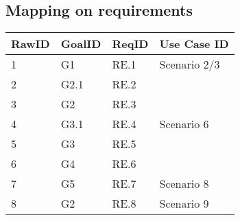 \subsection{Mapping on requirements}
\begin{center}
	\begin{tabular}{ | l | p{2cm} | p{2cm}| p{2cm}|} 
		\hline
		 RawID & GoalID & ReqID & Use Case ID \\
		\hline
		1&G1&RE.1&Scenario 2/3\\
		\hline
		2&G2.1&RE.2&\\
		\hline
		3&G2&RE.3&\\
		\hline
		4&G3.1&RE.4&Scenario 6\\
		\hline
		5&G3&RE.5&\\
		\hline
		6&G4&RE.6&\\
		\hline
		7&G5&RE.7&Scenario 8\\
		\hline
		8&G2&RE.8&Scenario 9\\
		\hline
	\end{tabular}
\end{center}


 